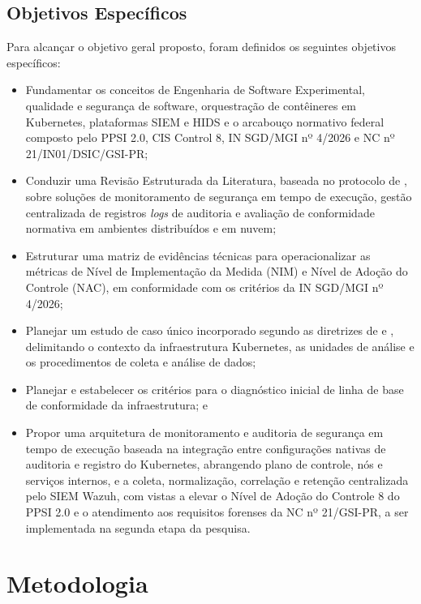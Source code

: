 \subsection{Objetivos Específicos}
\label{subsec:intro_objetivos_especificos}
\label{subsec:intro_obj_especificos}

Para alcançar o objetivo geral proposto, foram definidos os seguintes objetivos específicos:
\begin{itemize}
    \item Fundamentar os conceitos de Engenharia de Software Experimental, qualidade e segurança de software, orquestração de contêineres em Kubernetes, plataformas SIEM e HIDS e o arcabouço normativo federal composto pelo PPSI 2.0, CIS Control 8, IN SGD/MGI nº 4/2026 e NC nº 21/IN01/DSIC/GSI-PR;
    \item Conduzir uma Revisão Estruturada da Literatura, baseada no protocolo de , sobre soluções de monitoramento de segurança em tempo de execução, gestão centralizada de registros \textit{logs} de auditoria e avaliação de conformidade normativa em ambientes distribuídos e em nuvem;
    \item Estruturar uma matriz de evidências técnicas para operacionalizar as métricas de Nível de Implementação da Medida (NIM) e Nível de Adoção do Controle (NAC), em conformidade com os critérios da IN SGD/MGI nº 4/2026;
    \item Planejar um estudo de caso único incorporado segundo as diretrizes de  e , delimitando o contexto da infraestrutura Kubernetes, as unidades de análise e os procedimentos de coleta e análise de dados;
    \item Planejar e estabelecer os critérios para o diagnóstico inicial de linha de base de conformidade da infraestrutura; e
    \item Propor uma arquitetura de monitoramento e auditoria de segurança em tempo de execução baseada na integração entre configurações nativas de auditoria e registro do Kubernetes, abrangendo plano de controle, nós e serviços internos, e a coleta, normalização, correlação e retenção centralizada pelo SIEM Wazuh, com vistas a elevar o Nível de Adoção do Controle 8 do PPSI 2.0 e o atendimento aos requisitos forenses da NC nº 21/GSI-PR, a ser implementada na segunda etapa da pesquisa.
\end{itemize}

\section{Metodologia}
\label{sec:intro_metodologia}

